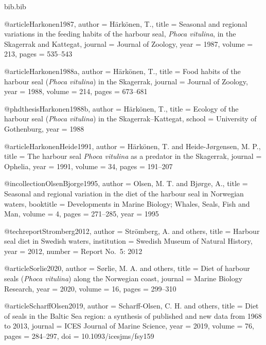 \begin{filecontents*}{bib.bib}

@article{Harkonen1987,
  author  = {H{\"a}rk{\"o}nen, T.},
  title   = {Seasonal and regional variations in the feeding habits of the harbour seal, \textit{Phoca vitulina}, in the {S}kagerrak and {K}attegat},
  journal = {Journal of Zoology},
  year    = {1987},
  volume  = {213},
  pages   = {535--543}
}

@article{Harkonen1988a,
  author  = {H{\"a}rk{\"o}nen, T.},
  title   = {Food habits of the harbour seal (\textit{Phoca vitulina}) in the {S}kagerrak},
  journal = {Journal of Zoology},
  year    = {1988},
  volume  = {214},
  pages   = {673--681}
}

@phdthesis{Harkonen1988b,
  author  = {H{\"a}rk{\"o}nen, T.},
  title   = {Ecology of the harbour seal (\textit{Phoca vitulina}) in the {S}kagerrak--{K}attegat},
  school  = {University of Gothenburg},
  year    = {1988}
}

@article{HarkonenHeide1991,
  author  = {H{\"a}rk{\"o}nen, T. and Heide-J{\o}rgensen, M. P.},
  title   = {The harbour seal \textit{Phoca vitulina} as a predator in the {S}kagerrak},
  journal = {Ophelia},
  year    = {1991},
  volume  = {34},
  pages   = {191--207}
}

@incollection{OlsenBjorge1995,
  author    = {Olsen, M. T. and Bj{\o}rge, A.},
  title     = {Seasonal and regional variation in the diet of the harbour seal in {N}orwegian waters},
  booktitle = {Developments in Marine Biology; Whales, Seals, Fish and Man},
  volume    = {4},
  pages     = {271--285},
  year      = {1995}
}

@techreport{Stromberg2012,
  author      = {Str{\"o}mberg, A. and others},
  title       = {Harbour seal diet in {S}wedish waters},
  institution = {Swedish Museum of Natural History},
  year        = {2012},
  number      = {Report No.~5: 2012}
}

@article{Sorlie2020,
  author  = {S{\o}rlie, M. A. and others},
  title   = {Diet of harbour seals (\textit{Phoca vitulina}) along the {N}orwegian coast},
  journal = {Marine Biology Research},
  year    = {2020},
  volume  = {16},
  pages   = {299--310}
}

@article{ScharffOlsen2019,
  author  = {Scharff-Olsen, C. H. and others},
  title   = {Diet of seals in the {B}altic {S}ea region: a synthesis of published and new data from 1968 to 2013},
  journal = {ICES Journal of Marine Science},
  year    = {2019},
  volume  = {76},
  pages   = {284--297},
  doi     = {10.1093/icesjms/fsy159}
}


\end{filecontents*}
